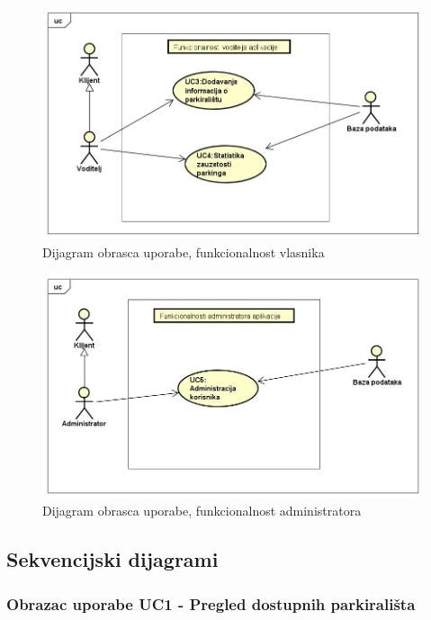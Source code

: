 {%
\begin{figure}[!htb]
	\centering
	\includegraphics[width=1\linewidth]{dijagrami/dijagramVoditelj}
	\caption{Dijagram obrasca uporabe, funkcionalnost vlasnika}
	\label{fig:dijagramvoditelj}
\end{figure}

\begin{figure}[!htb]
	\centering
	\includegraphics[width=1\linewidth]{dijagrami/dijagramAdmin}
	\caption{Dijagram obrasca uporabe, funkcionalnost administratora}
	\label{fig:dijagramadmin}
\end{figure}




\newpage
	
\subsection{Sekvencijski dijagrami}

\subsubsection{Obrazac uporabe UC1 - Pregled dostupnih parkirališta}

}
